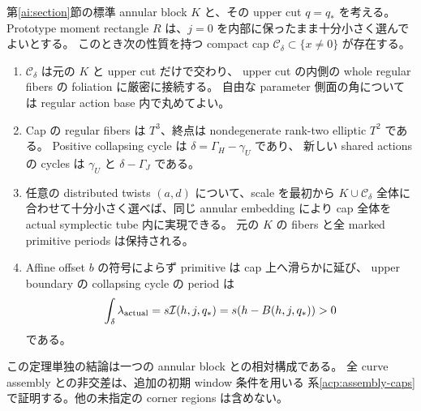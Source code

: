 \begin{theorem}\label{acp:actual-cap}
第\ref{ai:section}節の標準 annular block $K$ と、その upper cut $q=q_*$ を考える。
Prototype moment rectangle $R$ は、$j=0$ を内部に保ったまま十分小さく選んでよいとする。
このとき次の性質を持つ compact cap $\mathcal C_\delta\subset\{x\ne0\}$ が存在する。
\begin{enumerate}
\item $\mathcal C_\delta$ は元の $K$ と upper cut だけで交わり、
upper cut の内側の whole regular fibers の foliation に厳密に接続する。
自由な parameter 側面の角については regular action base 内で丸めてよい。
\item Cap の regular fibers は $T^3$、終点は nondegenerate rank-two elliptic $T^2$ である。
Positive collapsing cycle は $\delta=\Gamma_H-\gamma_U$ であり、
新しい shared actions の cycles は $\gamma_U$ と $\delta-\Gamma_J$ である。
\item 任意の distributed twists $(a,d)$ について、scale を最初から $K\cup\mathcal C_\delta$
全体に合わせて十分小さく選べば、同じ annular embedding により
cap 全体を actual symplectic tube 内に実現できる。
元の $K$ の fibers と全 marked primitive periods は保持される。
\item Affine offset $b$ の符号によらず primitive は cap 上へ滑らかに延び、
upper boundary の collapsing cycle の period は
\begin{equation}\label{acp:action}
 \int_\delta\lambda_{\rm actual}
 =s\mathcal I(h,j,q_*)=s(h-B(h,j,q_*))>0
\end{equation}
である。
\end{enumerate}
この定理単独の結論は一つの annular block との相対構成である。
全 curve assembly との非交差は、追加の初期 window 条件を用いる
系\ref{acp:assembly-caps}で証明する。他の未指定の corner regions は含めない。
\end{theorem}

